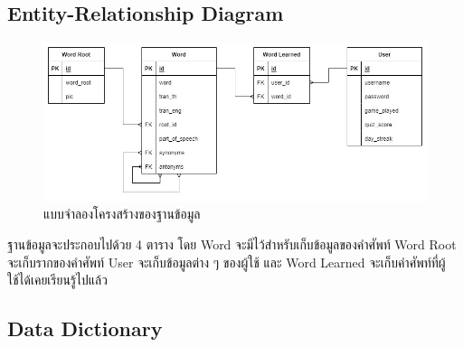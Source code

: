 \documentclass[12pt,oneside,openright,a4paper]{cpe-thai-project}
\begin{document}
\subsection{Entity-Relationship Diagram}
\begin{figure}[!h]\centering
	\includegraphics[width=\textwidth, keepaspectratio=true]{image/chap3/ER diagrams.jpg}
	\caption{แบบจำลองโครงสร้างของฐานข้อมูล}\label{fig:ERDiagram}
\end{figure}
\hspace{1cm}
ฐานข้อมูลจะประกอบไปด้วย 4 ตาราง โดย Word จะมีไว้สำหรับเก็บข้อมูลของคำศัพท์ Word Root
จะเก็บรากของคำศัพท์ User จะเก็บข้อมูลต่าง ๆ ของผู้ใช้ และ Word Learned จะเก็บคำศัพท์ที่ผู้ใช้ได้เคยเรียนรู้ไปแล้ว

\pagebreak
\subsection{Data Dictionary}
\end{document}

